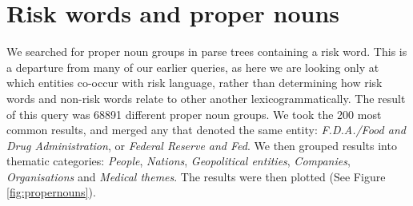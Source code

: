 	\section{Risk words and proper nouns}

                We searched for proper noun groups in parse trees containing a risk word. This is a departure from many of our earlier queries, as here we are looking only at which entities co-occur with risk language, rather than determining how risk words and non-risk words relate to other another lexicogrammatically. The result of this query was 68891 different proper noun groups. We took the 200 most common results, and merged any that denoted the same entity: \emph{F.D.A.\slash Food and Drug Administration}, or \emph{Federal Reserve and Fed}. We then grouped results into thematic categories: \emph{People}, \emph{Nations}, \emph{Geopolitical entities}, \emph{Companies}, \emph{Organisations} and \emph{Medical themes}. The results were then plotted (See Figure \ref{fig:propernouns}). 

